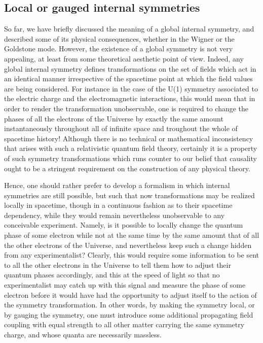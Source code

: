 \documentclass[a4paper,11pt]{article}
\begin{document}
\subsection{Local or gauged internal symmetries}
\label{Subsect4.3}

So far, we have briefly discussed the meaning of a global internal
symmetry, and described some of its physical consequences, whether
in the Wigner or the Goldstone mode. However, the
existence of a global symmetry is not very appealing, at least from
some theoretical aesthetic point of view. Indeed, any global internal
symmetry defines transformations on the set of fields which act
in an identical manner irrespective of the spacetime point at which the field
values are being considered. For instance in the case of the U(1) symmetry
associated to the electric charge and the electromagnetic interactions,
this would mean that in order to render the transformation unobservable,
one is required to change the phases of all the electrons of the Universe
by exactly the same amount instantaneously throughout all of infinite
space and troughout the whole of spacetime history! Although there is
no technical or mathematical inconsistency that arises with such a
relativistic quantum field theory, certainly it is a property of such
symmetry transformations which runs counter to our belief that causality
ought to be a stringent requirement on the construction of any physical
theory.

Hence, one should rather prefer to develop a formalism in which internal
symmetries are still possible, but such that now transformations may
be realized locally in spacetime, though in a continuous fashion as
to their spacetime dependency, while they would remain nevertheless
unobservable to any conceivable experiment. Namely, is it possible to
locally change the quantum phase of some electron while not at the same
time by the same amount that of all the other electrons of the Universe,
and nevertheless keep such a change hidden from any experimentalist?
Clearly, this would require some information to be sent to all the
other electrons in the Universe to tell them how to adjust their quantum
phases accordingly, and this at the speed of light so that no experimentalist
may catch up with this signal and measure the phase of some electron before 
it would have had the opportunity to adjust itself to the action of the
symmetry transformation. In other words, by making the symmetry local, or 
by gauging the symmetry, one must introduce some additional propagating 
field coupling with equal strength to all other matter carrying the same 
symmetry charge, and whose quanta are necessarily massless.
\end{document}
